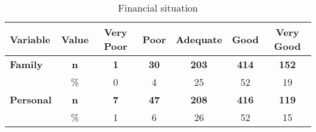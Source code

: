 \documentclass[
]{article}
\begin{document}
\begin{table}

\caption{\label{tab:mom-edu-table}Mother's educational level}
\centering
{}
\end{table}

\begin{table}

\caption{\label{tab:fin-sit-table}Financial situation}
\centering
\begin{tabular}[t]{l|c|c|c|c|c|c}
\hline
Variable & Value & Very Poor & Poor & Adequate & Good & Very Good\\
\hline
\textbf{Family} & \textbf{n} & \textbf{1} & \textbf{30} & \textbf{203} & \textbf{414} & \textbf{152}\\
\hline
 & \% & 0 & 4 & 25 & 52 & 19\\
\hline
\textbf{Personal} & \textbf{n} & \textbf{7} & \textbf{47} & \textbf{208} & \textbf{416} & \textbf{119}\\
\hline
 & \% & 1 & 6 & 26 & 52 & 15\\
\hline
\end{tabular}
\end{table}
\end{document}

